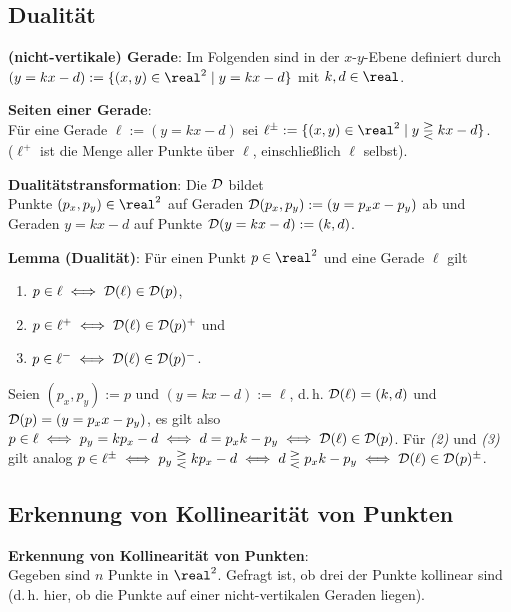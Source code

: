 \subsection{%
    Dualität%
}

\textbf{(nicht-vertikale) Gerade}:
Im Folgenden sind  in der $x$-$y$-Ebene definiert durch
$(y = kx - d) := \{(x, y) \in \real^2 \;|\; y = kx - d\}$ mit $k, d \in \real$.

\textbf{Seiten einer Gerade}:\\
Für eine Gerade $\ell := (y = kx - d)$ sei
$\ell^{\pm} := \{(x, y) \in \real^2 \;|\; y \gtreqless kx - d\}$.\\
($\ell^+$ ist die Menge aller Punkte über $\ell$, einschließlich $\ell$ selbst).

\textbf{Dualitätstransformation}:
Die  $\mathcal{D}$ bildet\\
Punkte $(p_x, p_y) \in \real^2$ auf Geraden $\mathcal{D}(p_x, p_y) := (y = p_x x - p_y)$ ab und\\
Geraden $y = kx - d$ auf Punkte $\mathcal{D}(y = kx - d) := (k, d)$.

\textbf{Lemma (Dualität)}:
Für einen Punkt $p \in \real^2$ und eine Gerade $\ell$ gilt
\begin{enumerate}
    \item
    $p \in \ell \iff \mathcal{D}(\ell) \in \mathcal{D}(p)$,

    \item
    $p \in \ell^+ \iff \mathcal{D}(\ell) \in \mathcal{D}(p)^+$ und

    \item
    $p \in \ell^- \iff \mathcal{D}(\ell) \in \mathcal{D}(p)^-$.
\end{enumerate}

\begin{Beweis}
    Seien $(p_x, p_y) := p$ und $(y = kx - d) := \ell$, d.\,h.
    $\mathcal{D}(\ell) = (k, d)$ und $\mathcal{D}(p) = (y = p_x x - p_y)$,
    es gilt also $p \in \ell \iff p_y = kp_x - d \iff d = p_x k - p_y \iff \mathcal{D}(\ell) \in \mathcal{D}(p)$.
    Für \emph{(2)} und \emph{(3)} gilt analog
    $p \in \ell^\pm \iff p_y \gtreqless kp_x - d \iff
    d \gtreqless p_x k - p_y \iff \mathcal{D}(\ell) \in \mathcal{D}(p)^\pm$.
\end{Beweis}

\subsection{%
    Erkennung von Kollinearität von Punkten%
}

\textbf{Erkennung von Kollinearität von Punkten}:\\
Gegeben sind $n$ Punkte in $\real^2$.
Gefragt ist, ob drei der Punkte kollinear sind\\
(d.\,h. hier, ob die Punkte auf einer nicht-vertikalen Geraden liegen).

